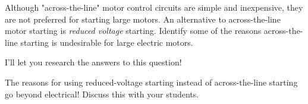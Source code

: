 

Although "across-the-line" motor control circuits are simple and inexpensive, they are not preferred for starting large motors.  An alternative to across-the-line motor starting is {\it reduced voltage} starting.  Identify some of the reasons across-the-line starting is undesirable for large electric motors.







I'll let you research the answers to this question!







The reasons for using reduced-voltage starting instead of across-the-line starting go beyond electrical!  Discuss this with your students.




